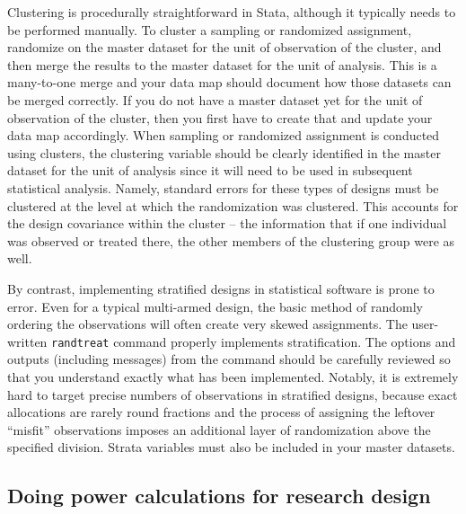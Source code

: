 Clustering is procedurally straightforward in Stata,
although it typically needs to be performed manually.
To cluster a sampling or randomized assignment,
randomize on the master dataset for the unit of observation of the cluster,
and then merge the results to the master dataset for the unit of analysis.
This is a many-to-one merge and your data map should document
how those datasets can be merged correctly.
If you do not have a master dataset yet for the unit of observation of the cluster,
then you first have to create that and update your data map accordingly.
When sampling or randomized assignment is conducted using clusters,
the clustering variable should be clearly identified in the master dataset
for the unit of analysis
since it will need to be used in subsequent statistical analysis.
Namely, standard errors for these types of designs must be clustered
at the level at which the randomization was clustered.
This accounts for the design covariance within the cluster --
the information that if one individual was observed or treated there,
the other members of the clustering group were as well.

By contrast, implementing stratified designs in statistical software is prone to error.
Even for a typical multi-armed design, the basic method of randomly ordering the observations
will often create very skewed assignments.
The user-written \texttt{randtreat} command properly implements stratification.\cite{carril2017dealing}
The options and outputs (including messages) from the command should be carefully reviewed
so that you understand exactly what has been implemented.
Notably, it is extremely hard to target precise numbers of observations
in stratified designs, because exact allocations are rarely round fractions
and the process of assigning the leftover ``misfit'' observations
imposes an additional layer of randomization above the specified division.
Strata variables must also be included in your master datasets.


\subsection{Doing power calculations for research design}

